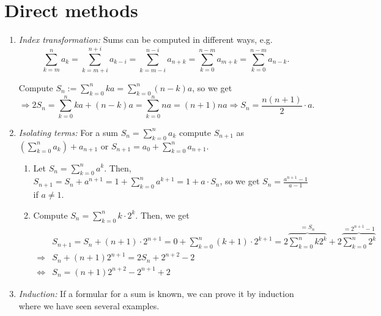 \documentclass[language=english]{../../Template/TemplateLecture}
\begin{document}
\section{Direct methods}
\begin{enumerate}[$(i)$]
    \item \emph{Index transformation:} Sums can be computed in different ways, e.g.
    \begin{equation}
        \sum_{k = m}^n a_k = \sum_{k = m + i}^{n + i} a_{k - i} = \sum_{k = m - i}^{n - i} a_{n + k} = \sum_{k = 0}^{n - m} a_{m + k} = \sum_{k = 0}^{n-m} a_{n - k}.
    \end{equation}
    \begin{beispiel}
        Compute $S_n := \sum_{k = 0}^n ka = \sum_{k = 0}^n (n-k)a$, so we get
        \begin{equation}
            \Rightarrow 2S_n = \sum_{k = 0}^n ka + (n-k)a = \sum_{k = 0}^n na = (n+1)na \Rightarrow S_n = \frac{n(n+1)}{2} \cdot a.
        \end{equation}
    \end{beispiel}
    \item \emph{Isolating terms:} For a sum $S_n = \sum_{k = 0}^n a_k$ compute $S_{n+1}$ as $\left(\sum_{k = 0}^n a_k \right) + a_{n+1}$ or $S_{n+1} = a_0 + \sum_{k = 0}^n a_{n+1}$.
    \begin{beispiel}
        \begin{enumerate}[$(1)$]
            \item Let $S_n = \sum_{k = 0}^n a^k$. Then, $S_{n+1} = S_n + a^{n+1} = 1 + \sum_{k = 0}^n a^{k+1} = 1 + a \cdot S_n$, so we get $S_n = \frac{a^{n+1} - 1}{a - 1}$ if $a \neq 1$.
            \item Compute $S_n = \sum_{k = 0}^n k \cdot 2^k$. Then, we get 
            \begin{equation}
                \begin{split}
                    & S_{n+1} = S_n + (n+1) \cdot 2^{n+1} = 0 + \sum_{k = 0}^n (k+1) \cdot 2^{k+1} = 2\overset{=S_n}{\overbrace{\sum_{k = 0}^n k 2^k}} + 2 \overset{=2^{n+1} - 1}{\overbrace{\sum_{k = 0}^n 2^k}} \\
                    \Rightarrow& S_n + (n+1)2^{n+1} = 2S_n + 2^{n+2} - 2 \\
                    \Leftrightarrow& S_n = (n+1)2^{n+2} - 2^{n+1} + 2
                \end{split}
            \end{equation}
        \end{enumerate}
    \end{beispiel} 
    \item \emph{Induction:} If a formular for a sum is known, we can prove it by induction where we have seen several examples.
    

\end{enumerate}
\end{document}
